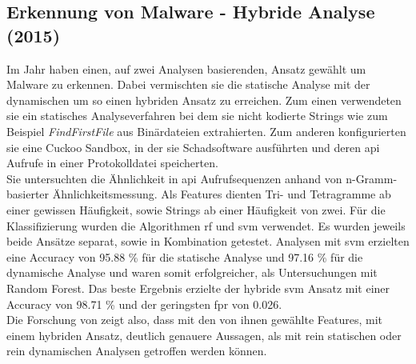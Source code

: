 \documentclass[
    12pt, %
    DIV10,
    ngerman, %
    a4paper, %
    oneside, %
    titlepage, %
    parskip=half, %
    headings=normal, %
    listof=totoc, %
    bibliography=totoc, %
    index=totoc, %
    captions=tableheading, %
    final %
]{scrreprt}
\begin{document}
\subsection{Erkennung von Malware - Hybride Analyse (2015)}
Im Jahr \citeyear{Shijo2015} haben \textcite{Shijo2015} einen, auf zwei Analysen basierenden, Ansatz gewählt um Malware zu erkennen. Dabei vermischten sie die statische Analyse mit der dynamischen um so einen hybriden Ansatz zu erreichen. Zum einen verwendeten sie ein statisches Analyseverfahren bei dem sie nicht kodierte Strings wie zum Beispiel \emph{FindFirstFile} aus Binärdateien extrahierten. Zum anderen konfigurierten sie eine Cuckoo Sandbox, in der sie Schadsoftware ausführten und deren \ac{api} Aufrufe in einer Protokolldatei speicherten.\\
Sie untersuchten die Ähnlichkeit in \ac{api} Aufrufsequenzen anhand von n-Gramm-basierter Ähnlichkeitsmessung. 
Als Features dienten Tri- und Tetragramme ab einer gewissen Häufigkeit, sowie Strings ab einer Häufigkeit von zwei.
Für die Klassifizierung wurden die Algorithmen \ac{rf} und \ac{svm} verwendet.
Es wurden jeweils beide Ansätze separat, sowie in Kombination getestet. Analysen mit \ac{svm} erzielten eine Accuracy von 95.88 \% für die statische Analyse und 97.16 \% für die dynamische Analyse und waren somit erfolgreicher, als Untersuchungen mit Random Forest. Das beste Ergebnis erzielte der hybride \ac{svm} Ansatz mit einer Accuracy von 98.71 \% und der geringsten \ac{fpr} von 0.026.\\
Die Forschung von \textcite{Shijo2015} zeigt also, dass mit den von ihnen gewählte Features, mit einem hybriden Ansatz, deutlich genauere Aussagen, als mit rein statischen oder rein dynamischen Analysen getroffen werden können.

%
\end{document}
